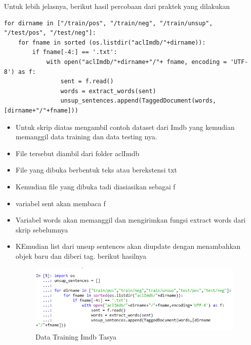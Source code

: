 Untuk lebih jelasnya, berikut hasil percobaan dari praktek yang dilakukan
\begin{verbatim}
for dirname in ["/train/pos", "/train/neg", "/train/unsup", "/test/pos", "/test/neg"]:
    for fname in sorted (os.listdir("aclImdb/"+dirname)):
        if fname[-4:] == '.txt':
            with open("aclImdb/"+dirname+"/"+ fname, encoding = 'UTF-8') as f:
                sent = f.read()
                words = extract_words(sent)
                unsup_sentences.append(TaggedDocument(words,[dirname+"/"+fname]))
\end{verbatim}
\begin{itemize}
\item Untuk skrip diatas mengambil contoh dataset dari Imdb yang kemudian memanggil data training dan data testing nya.
\item File tersebut diambil dari folder aclImdb
\item File yang dibuka berbentuk teks atau berekstensi txt
\item Kemudian file yang dibuka tadi diasiasikan sebagai f
\item variabel sent akan membaca f
\item Variabel words akan memanggil dan mengirimkan fungsi extract words dari skrip sebelumnya
\item KEmudian list dari unsup sentences akan diupdate dengan menambahkan objek baru dan diberi tag. berikut hasilnya
\begin{figure}[ht]
\centering
\includegraphics[scale=0.5]{figures/chapter5tasya20.png}
\caption{Data Training Imdb Tasya}
\label{Praktek}
\end{figure}
\end{itemize}
